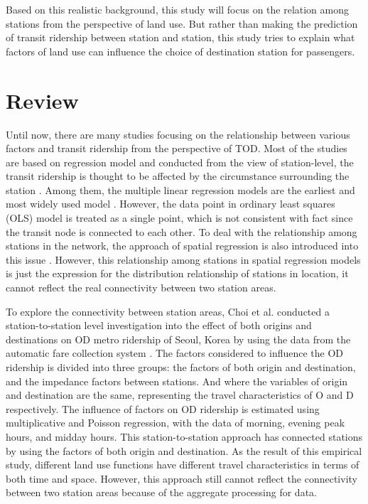 Based on this realistic background, this study will focus on the relation among stations from the perspective of land use. But rather than making the prediction of transit ridership between station and station, this study tries to explain what factors of land use can influence the choice of destination station for passengers. 

\section{Review}
%
Until now, there are many studies focusing on the relationship between various factors and transit ridership from the perspective of TOD. Most of the studies are based on regression model and conducted from the view of station-level, the transit ridership is thought to be affected by the circumstance surrounding the station \cite{cervero1997travel,taylor2003analyzing,zhao2005transit,estupinan2008relationship,taylor2009nature,sohn2010factors,gutierrez2011transit,jun2015land}. Among them, the multiple linear regression models are the earliest and most widely used model \cite{cervero1997travel,gutierrez2011transit}. However, the data point in ordinary least squares (OLS) model is treated as a single point, which is not consistent with fact since the transit node is connected to each other. To deal with the relationship among stations in the network, the approach of spatial regression is also introduced into this issue \cite{cardozo2012application,jun2015land}. However, this relationship among stations in spatial regression models is just the expression for the distribution relationship of stations in location, it cannot reflect the real connectivity between two station areas.

%
To explore the connectivity between station areas, Choi et al. conducted a station-to-station level investigation into the effect of both origins and destinations on OD metro ridership of Seoul, Korea by using the data from the automatic fare collection system \cite{choi2012analysis}. The factors considered to influence the OD ridership is divided into three groups: the factors of both origin and destination, and the impedance factors between stations. And where the variables of origin and destination are the same, representing the travel characteristics of O and D respectively. The influence of factors on OD ridership is estimated using multiplicative and Poisson regression, with the data of morning, evening peak hours, and midday hours. This station-to-station approach has connected stations by using the factors of both origin and destination. As the result of this empirical study, different land use functions have different travel characteristics in terms of both time and space. However, this approach still cannot reflect the connectivity between two station areas because of the aggregate processing for data.

